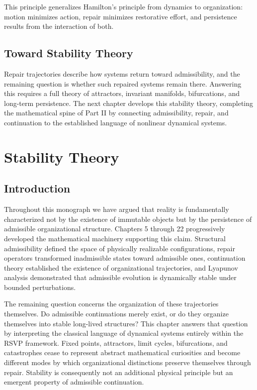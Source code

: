 \documentclass[11pt,oneside]{book}
\numberwithin{equation}{chapter}
\theoremstyle{definition}
\theoremstyle{plain}
\begin{document}
This principle generalizes Hamilton's principle from dynamics to organization: motion minimizes action, repair minimizes restorative effort, and persistence results from the interaction of both.

\section{Toward Stability Theory}

Repair trajectories describe how systems return toward admissibility, and the remaining question is whether such repaired systems remain there. Answering this requires a full theory of attractors, invariant manifolds, bifurcations, and long-term persistence. The next chapter develops this stability theory, completing the mathematical spine of Part II by connecting admissibility, repair, and continuation to the established language of nonlinear dynamical systems.

\chapter{Stability Theory}

\section{Introduction}

Throughout this monograph we have argued that reality is fundamentally characterized not by the existence of immutable objects but by the persistence of admissible organizational structure. Chapters 5 through 22 progressively developed the mathematical machinery supporting this claim. Structural admissibility defined the space of physically realizable configurations, repair operators transformed inadmissible states toward admissible ones, continuation theory established the existence of organizational trajectories, and Lyapunov analysis demonstrated that admissible evolution is dynamically stable under bounded perturbations.

The remaining question concerns the organization of these trajectories themselves. Do admissible continuations merely exist, or do they organize themselves into stable long-lived structures? This chapter answers that question by interpreting the classical language of dynamical systems entirely within the RSVP framework. Fixed points, attractors, limit cycles, bifurcations, and catastrophes cease to represent abstract mathematical curiosities and become different modes by which organizational distinctions preserve themselves through repair. Stability is consequently not an additional physical principle but an emergent property of admissible continuation.
\end{document}
